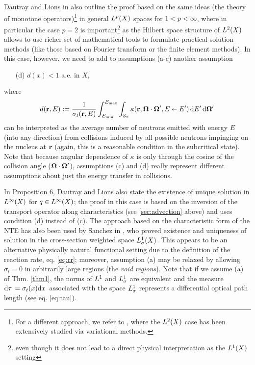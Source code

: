 Dautray and Lions in 
\cite[\S2, Chap. XXI]{DautrayLions} also outline the proof based on the same ideas (the theory of monotone 
operators)\footnote{For a different approach, we refer to \cite[Chap. 3]{Agoshkov}, where the $\Lp[2](X)$ case has been extensively studied via variational methods.} in
general $\Lp(X)$ spaces for $1 < p < \infty$, where in particular the case $p = 2$ is important\footnote{even though it does not lead to a direct 
physical interpretation as the $\Lp[1](X)$ setting} as the Hilbert space structure of $\Lp[2](X)$ allows to use richer 
set of mathematical tools to formulate practical solution methods (like those based on Fourier transform or the finite 
element methods). In this case, however, we need to add to assumptions (a-c) another assumption
\begin{enumerate}
  \item[(d)] $d(x) < 1$ a.e. in $X$, 
\end{enumerate}
where
\begin{equation}\label{eq:d} 
d(\br,E) := 
  \frac{1}{\sigma_t(\br,E)}\int_{\Emin}^{\Emax}\int_{\Sphere} \kappa(\br,\bomega\cdot\bomega',
	    E\sla E')\,\d{E'}\d{\bomega'}
\end{equation}
can be interpreted as the average number of neutrons emitted with energy $E$ (into any direction) from
collisions induced by all possible neutrons impinging on the nucleus at $\br$ (again, this is a reasonable condition
in the subcritical state). Note that because angular dependence of $\kappa$ is only through the cosine of the collision
angle ($\bomega\cdot\bomega'$), assumptions (c) and (d) really represent different assumptions about just the energy
transfer in collisions.

In Proposition 6, Dautray and Lions also 
state the existence of unique solution in $\Lp[\infty](X)$ for $q\in \Lp[\infty](X)$; the proof in this case is based on
 the inversion of the transport operator along characteristics (see \ref{sec:advection} above) and uses condition (d)
 instead of (c).
 The approach based on the characteristic form of the NTE has also been used by Sanchez in \cite{Sanchez3}, who proved  
 existence and uniqueness of solution in the cross-section weighted space $\Lp[1]_{\sigma}(X)$.
 This appears to be an alternative physically natural functional setting due to the definition of the reaction rate, eq. 
 \eqref{eq:rr}; moreover, assumption (a) may be relaxed by allowing $\sigma_t = 0$ in arbitrarily large regions 
  (the \textit{void regions}). Note that if we assume (a) of Thm. \ref{thm1}, the norms of $\Lp[1]$ and
  $\Lp[1]_{\sigma}$ are equivalent and the measure $\d{\tau} = \sigma_t(x) \d{x}$ associated with the space
  $\Lp[1]_{\sigma}$ represents a differential optical path length (see eq. \eqref{eq:tau}).
  
